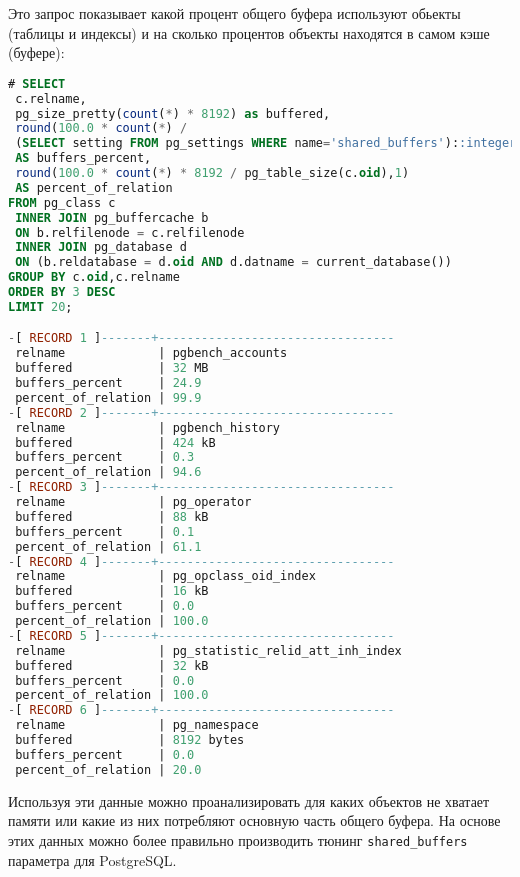 Это запрос показывает какой процент общего буфера используют обьекты (таблицы и индексы) и на сколько процентов объекты находятся в самом кэше (буфере):

\begin{lstlisting}[language=SQL,label=lst:pgbuffercache4,caption=pg\_buffercache]
# SELECT
 c.relname,
 pg_size_pretty(count(*) * 8192) as buffered,
 round(100.0 * count(*) /
 (SELECT setting FROM pg_settings WHERE name='shared_buffers')::integer,1)
 AS buffers_percent,
 round(100.0 * count(*) * 8192 / pg_table_size(c.oid),1)
 AS percent_of_relation
FROM pg_class c
 INNER JOIN pg_buffercache b
 ON b.relfilenode = c.relfilenode
 INNER JOIN pg_database d
 ON (b.reldatabase = d.oid AND d.datname = current_database())
GROUP BY c.oid,c.relname
ORDER BY 3 DESC
LIMIT 20;

-[ RECORD 1 ]-------+---------------------------------
 relname             | pgbench_accounts
 buffered            | 32 MB
 buffers_percent     | 24.9
 percent_of_relation | 99.9
-[ RECORD 2 ]-------+---------------------------------
 relname             | pgbench_history
 buffered            | 424 kB
 buffers_percent     | 0.3
 percent_of_relation | 94.6
-[ RECORD 3 ]-------+---------------------------------
 relname             | pg_operator
 buffered            | 88 kB
 buffers_percent     | 0.1
 percent_of_relation | 61.1
-[ RECORD 4 ]-------+---------------------------------
 relname             | pg_opclass_oid_index
 buffered            | 16 kB
 buffers_percent     | 0.0
 percent_of_relation | 100.0
-[ RECORD 5 ]-------+---------------------------------
 relname             | pg_statistic_relid_att_inh_index
 buffered            | 32 kB
 buffers_percent     | 0.0
 percent_of_relation | 100.0
-[ RECORD 6 ]-------+---------------------------------
 relname             | pg_namespace
 buffered            | 8192 bytes
 buffers_percent     | 0.0
 percent_of_relation | 20.0
\end{lstlisting}

Используя эти данные можно проанализировать для каких объектов не хватает памяти или какие из них потребляют основную часть общего буфера. На основе этих данных можно более правильно производить тюнинг \lstinline!shared_buffers! параметра для PostgreSQL.